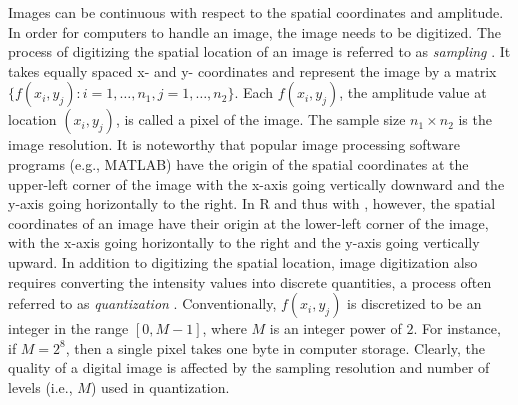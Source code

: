 Images can be continuous with respect to the spatial coordinates and amplitude. In order for computers to handle an image, the image needs to be digitized.
The process of digitizing the spatial location of an image is referred to as \textit{sampling} \citep{gonzalez2018digital}. It takes equally spaced x- and y- coordinates and represent the image by a matrix \(\{f(x_i, y_j): i = 1, \ldots, n_1, j = 1, \ldots, n_2 \}\). Each \(f(x_i, y_j)\), the amplitude value at location \((x_i, y_j)\), is called a pixel of the image. The sample size \(n_1 \times n_2\) is the image resolution. It is noteworthy that popular image processing software programs (e.g., MATLAB) have the origin of the spatial coordinates at the upper-left corner of the image with the x-axis going vertically downward and the y-axis going horizontally to the right. In R and thus with , however, the spatial coordinates of an image have their origin at the lower-left corner of the image, with the x-axis going horizontally to the right and the y-axis going vertically upward. In addition to digitizing the spatial location, image digitization also requires converting the intensity values into discrete quantities, a process often referred to as \textit{quantization} \citep{qiu2005image}. Conventionally, \(f(x_i, y_j)\) is discretized to be an integer in the range \([0, M - 1]\), where \(M\) is an integer power of \(2\). For instance, if \(M = 2^8\), then a single pixel takes one byte in computer storage. Clearly, the quality of a digital image is affected by the sampling resolution and number of levels (i.e., \(M\)) used in quantization.

